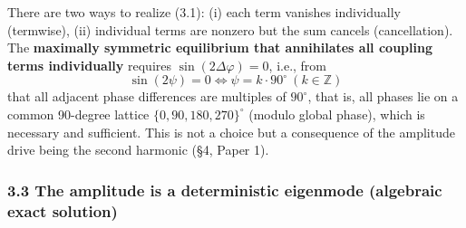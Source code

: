 \documentclass[
  a4paper,
]{ltjsarticle}
\begin{document}
There are two ways to realize (3.1): (i) each term vanishes individually
(termwise), (ii) individual terms are nonzero but the sum cancels
(cancellation). The \textbf{maximally symmetric equilibrium that
annihilates all coupling terms individually} requires
\(\sin(2\Delta\varphi)=0\), i.e., from
\[\sin(2\psi)=0\iff \psi=k\cdot90^\circ\ (k\in\mathbb Z)\] that all
adjacent phase differences are multiples of \(90^\circ\), that is, all
phases lie on a common 90-degree lattice \(\{0,90,180,270\}^\circ\)
(modulo global phase), which is necessary and sufficient. This is not a
choice but a consequence of the amplitude drive being the second
harmonic (§4, Paper 1).

\subsubsection{3.3 The amplitude is a deterministic eigenmode (algebraic
exact
solution)}\label{the-amplitude-is-a-deterministic-eigenmode-algebraic-exact-solution}
\end{document}
